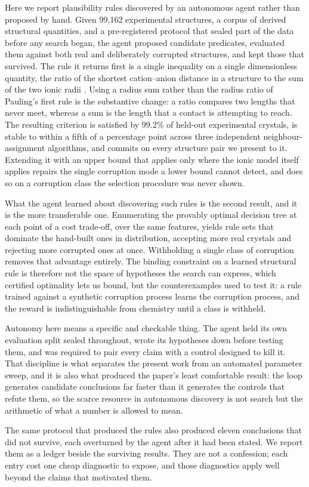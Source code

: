 Here we report plausibility rules discovered by an autonomous agent rather than proposed
by hand. Given 99{,}162 experimental structures, a corpus of derived structural
quantities, and a pre-registered protocol that sealed part of the data before any search
began, the agent proposed candidate predicates, evaluated them against both real and
deliberately corrupted structures, and kept those that survived. The rule it returns
first is a single inequality on a single dimensionless quantity, the ratio of the
shortest cation--anion distance in a structure to the sum of the two ionic radii
\cite{shannon1976revised}. Using a radius sum rather than the radius ratio of Pauling's
first rule is the substantive change: a ratio compares two lengths that never meet,
whereas a sum is the length that a contact is attempting to reach. The resulting
criterion is satisfied by 99.2\% of held-out experimental crystals, is stable to within a
fifth of a percentage point across three independent neighbour-assignment algorithms, and
commits on every structure pair we present to it. Extending it with an upper bound that
applies only where the ionic model itself applies repairs the single corruption mode a
lower bound cannot detect, and does so on a corruption class the selection procedure was
never shown.

What the agent learned about discovering such rules is the second result, and it is the
more transferable one. Enumerating the provably optimal decision tree at each point of a
cost trade-off, over the same features, yields rule sets that dominate the hand-built
ones in distribution, accepting more real crystals and rejecting more corrupted ones at
once. Withholding a single class of corruption removes that advantage entirely. The
binding constraint on a learned structural rule is therefore not the space of hypotheses
the search can express, which certified optimality lets us bound, but the counterexamples
used to test it: a rule trained against a synthetic corruption process learns the
corruption process, and the reward is indistinguishable from chemistry until a class is
withheld.

Autonomy here means a specific and checkable thing. The agent held its own evaluation
split sealed throughout, wrote its hypotheses down before testing them, and was required
to pair every claim with a control designed to kill it. That discipline is what separates
the present work from an automated parameter sweep, and it is also what produced the
paper's least comfortable result: the loop generates candidate conclusions far faster
than it generates the controls that refute them, so the scarce resource in autonomous
discovery is not search but the arithmetic of what a number is allowed to mean.

The same protocol that produced the rules also produced eleven conclusions that did not
survive, each overturned by the agent after it had been stated. We report them as a
ledger beside the surviving results. They are not a confession; each entry cost one cheap
diagnostic to expose, and those diagnostics apply well beyond the claims that motivated
them.
